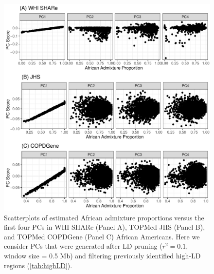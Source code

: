 \documentclass[12pt]{article}
\begin{document}
\begin{figure}[h]
\center
\includegraphics[width=\textwidth]{figs/pcs_vs_global/pruned_pcs_vs_global}
\caption{Scatterplots of estimated African admixture proportions versus the first four PCs in WHI SHARe (Panel A), TOPMed JHS (Panel B), and TOPMed COPDGene (Panel C) African Americans. Here we consider PCs that were generated after LD pruning ($r^2 = 0.1$, window size = 0.5 Mb) and filtering previously identified high-LD regions (\ref{tab:highLD}).}
\label{fig:prunedpcsvsglob}
\end{figure}
\end{document}
